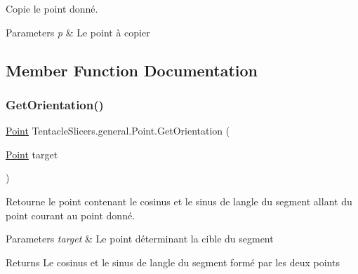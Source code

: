 Copie le point donné. 


\begin{DoxyParams}{Parameters}
{\em p} & Le point à copier \\
\hline
\end{DoxyParams}


\subsection{Member Function Documentation}
\mbox{\label{class_tentacle_slicers_1_1general_1_1_point_aeaf223f4a4242ee95a1937e4435ed420}} 
\subsubsection{\texorpdfstring{Get\+Orientation()}{GetOrientation()}\hspace{0.1cm}{\footnotesize\ttfamily [1/2]}}
{\footnotesize\ttfamily \hyperlink{class_tentacle_slicers_1_1general_1_1_point}{Point} Tentacle\+Slicers.\+general.\+Point.\+Get\+Orientation (\begin{DoxyParamCaption}\item[{\hyperlink{class_tentacle_slicers_1_1general_1_1_point}{Point}}]{target }\end{DoxyParamCaption})}



Retourne le point contenant le cosinus et le sinus de l\textquotesingle{}angle du segment allant du point courant au point donné. 


\begin{DoxyParams}{Parameters}
{\em target} & Le point déterminant la cible du segment \\
\hline
\end{DoxyParams}
\begin{DoxyReturn}{Returns}
Le cosinus et le sinus de l\textquotesingle{}angle du segment formé par les deux points 
\end{DoxyReturn}
\mbox{\label{class_tentacle_slicers_1_1general_1_1_point_acf9889a5ce17e162d19b33354e625e54}} 
